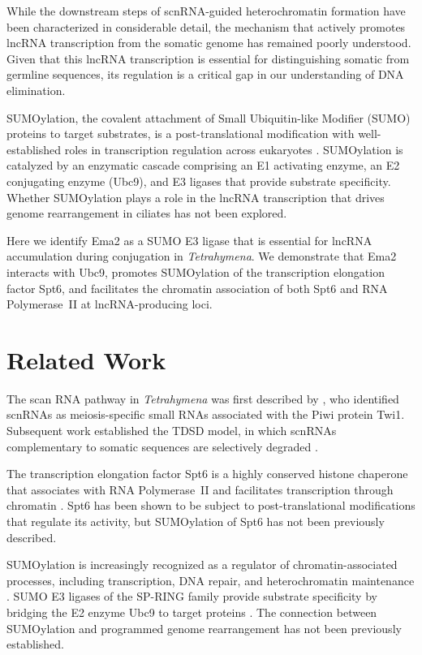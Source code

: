 \documentclass[11pt]{article}
\begin{document}
While the downstream steps of scnRNA-guided heterochromatin formation have been characterized in considerable detail, the mechanism that actively promotes lncRNA transcription from the somatic genome has remained poorly understood. Given that this lncRNA transcription is essential for distinguishing somatic from germline sequences, its regulation is a critical gap in our understanding of DNA elimination.

SUMOylation, the covalent attachment of Small Ubiquitin-like Modifier (SUMO) proteins to target substrates, is a post-translational modification with well-established roles in transcription regulation across eukaryotes \citep{gareau2010,hendriks2017}. SUMOylation is catalyzed by an enzymatic cascade comprising an E1 activating enzyme, an E2 conjugating enzyme (Ubc9), and E3 ligases that provide substrate specificity. Whether SUMOylation plays a role in the lncRNA transcription that drives genome rearrangement in ciliates has not been explored.

Here we identify Ema2 as a SUMO E3 ligase that is essential for lncRNA accumulation during conjugation in \textit{Tetrahymena}. We demonstrate that Ema2 interacts with Ubc9, promotes SUMOylation of the transcription elongation factor Spt6, and facilitates the chromatin association of both Spt6 and RNA Polymerase~II at lncRNA-producing loci.

\section{Related Work}

The scan RNA pathway in \textit{Tetrahymena} was first described by \citet{mochizuki2002}, who identified scnRNAs as meiosis-specific small RNAs associated with the Piwi protein Twi1. Subsequent work established the TDSD model, in which scnRNAs complementary to somatic sequences are selectively degraded \citep{aronica2008,noto2015}.

The transcription elongation factor Spt6 is a highly conserved histone chaperone that associates with RNA Polymerase~II and facilitates transcription through chromatin \citep{bortvin1996,ivanovska2011}. Spt6 has been shown to be subject to post-translational modifications that regulate its activity, but SUMOylation of Spt6 has not been previously described.

SUMOylation is increasingly recognized as a regulator of chromatin-associated processes, including transcription, DNA repair, and heterochromatin maintenance \citep{gareau2010,hendriks2017}. SUMO E3 ligases of the SP-RING family provide substrate specificity by bridging the E2 enzyme Ubc9 to target proteins \citep{johnson2001}. The connection between SUMOylation and programmed genome rearrangement has not been previously established.
\end{document}
